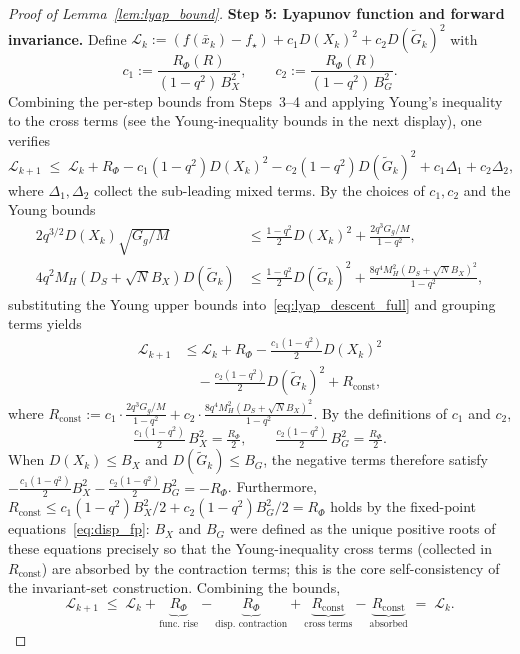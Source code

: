 \documentclass[review,onefignum,onetabnum]{siamart171218}
\begin{document}
\begin{proof}[Proof of Lemma~\ref{lem:lyap_bound}]
\smallskip
\noindent\textbf{Step 5: Lyapunov function and forward invariance.}
Define
$\mathcal L_k := (f(\bar x_k)-f_\star) + c_1 D(X_k)^2 + c_2 D(\tilde G_k)^2$
with
\[
  c_1 := \frac{R_\Phi(R)}{(1-q^2)\,B_X^2},
  \qquad
  c_2 := \frac{R_\Phi(R)}{(1-q^2)\,B_G^2}.
\]
Combining the per-step bounds from Steps~3--4 and applying Young's
inequality to the cross terms (see the Young-inequality bounds in the next display), one verifies
\begin{equation}\label{eq:lyap_descent_full}
  \mathcal L_{k+1}
  \;\le\;
  \mathcal L_k
  + R_\Phi
  - c_1(1-q^2)D(X_k)^2
  - c_2(1-q^2)D(\tilde G_k)^2
  + c_1\Delta_1 + c_2\Delta_2,
\end{equation}
where $\Delta_1,\Delta_2$ collect the sub-leading mixed terms.
By the choices of $c_1,c_2$ and the Young bounds
\begin{align*}
  2q^{3/2}D(X_k)\sqrt{G_g/M}
  &\le \tfrac{1-q^2}{2}D(X_k)^2 + \tfrac{2q^3 G_g/M}{1-q^2},\\
  4q^2 M_H(D_S{+}\sqrt{N}B_X)D(\tilde G_k)
  &\le \tfrac{1-q^2}{2}D(\tilde G_k)^2
  + \tfrac{8q^4 M_H^2(D_S{+}\sqrt{N}B_X)^2}{1-q^2},
\end{align*}
substituting the Young upper bounds into~\eqref{eq:lyap_descent_full}
and grouping terms yields
\begin{align*}
  \mathcal L_{k+1}
  &\le
  \mathcal L_k + R_\Phi
  - \tfrac{c_1(1{-}q^2)}{2}D(X_k)^2\\
  &\quad- \tfrac{c_2(1{-}q^2)}{2}D(\tilde G_k)^2
  + R_{\mathrm{const}},
\end{align*}
where $R_{\mathrm{const}}:=c_1\!\cdot\!\tfrac{2q^3 G_g/M}{1{-}q^2}
+c_2\!\cdot\!\tfrac{8q^4 M_H^2(D_S{+}\sqrt{N}B_X)^2}{1{-}q^2}$.
By the definitions of $c_1$ and $c_2$,
\[
  \tfrac{c_1(1{-}q^2)}{2}\,B_X^2
  = \tfrac{R_\Phi}{2},
  \qquad
  \tfrac{c_2(1{-}q^2)}{2}\,B_G^2
  = \tfrac{R_\Phi}{2}.
\]
When $D(X_k)\le B_X$ and $D(\tilde G_k)\le B_G$, the negative terms
therefore satisfy
$-\tfrac{c_1(1{-}q^2)}{2}B_X^2-\tfrac{c_2(1{-}q^2)}{2}B_G^2
=-R_\Phi$.
Furthermore, $R_{\mathrm{const}}\le c_1(1{-}q^2)B_X^2/2+c_2(1{-}q^2)B_G^2/2=R_\Phi$
holds by the fixed-point equations~\eqref{eq:disp_fp}:
$B_X$ and $B_G$ were defined as the unique positive roots of these
equations precisely so that the Young-inequality cross terms (collected
in $R_{\mathrm{const}}$) are absorbed by the contraction terms;
this is the core self-consistency of the invariant-set construction.
Combining the bounds,
\[
  \mathcal L_{k+1}
  \;\le\;
  \mathcal L_k
  +\underbrace{R_\Phi}_{\text{func.\ rise}}
  -\underbrace{R_\Phi}_{\text{disp.\ contraction}}
  +\underbrace{R_{\mathrm{const}}}_{\text{cross terms}}
  -\underbrace{R_{\mathrm{const}}}_{\text{absorbed}}
  \;=\; \mathcal L_k.
\]


\end{proof}
\end{document}
